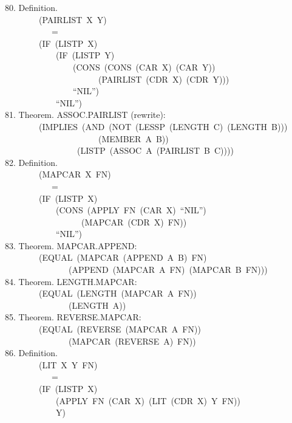 \documentclass[10pt]{book}
\newenvironment{pubasis}{\begin{flushleft}}{\end{flushleft}}
\begin{document}
\begin{pubasis}
80.     Definition.\\
~~~~~~~~(PAIRLIST~X~Y)\\
~~~~~~~~~~~=\\
~~~~~~~~(IF~(LISTP~X)\\
~~~~~~~~~~~~(IF~(LISTP~Y)\\
~~~~~~~~~~~~~~~~(CONS~(CONS~(CAR~X)~(CAR~Y))\\
~~~~~~~~~~~~~~~~~~~~~~(PAIRLIST~(CDR~X)~(CDR~Y)))\\
~~~~~~~~~~~~~~~~``NIL'')\\
~~~~~~~~~~~~``NIL'')\\

81.     Theorem.  ASSOC.PAIRLIST (rewrite):\\
~~~~~~~~(IMPLIES~(AND~(NOT~(LESSP~(LENGTH~C)~(LENGTH~B)))\\
~~~~~~~~~~~~~~~~~~~~~~(MEMBER~A~B))\\
~~~~~~~~~~~~~~~~~(LISTP~(ASSOC~A~(PAIRLIST~B~C))))\\

82.     Definition.\\
~~~~~~~~(MAPCAR~X~FN)\\
~~~~~~~~~~~=\\
~~~~~~~~(IF~(LISTP~X)\\
~~~~~~~~~~~~(CONS~(APPLY~FN~(CAR~X)~``NIL'')\\
~~~~~~~~~~~~~~~~~~(MAPCAR~(CDR~X)~FN))\\
~~~~~~~~~~~~``NIL'')\\

83.     Theorem.  MAPCAR.APPEND:\\
~~~~~~~~(EQUAL~(MAPCAR~(APPEND~A~B)~FN)\\
~~~~~~~~~~~~~~~(APPEND~(MAPCAR~A~FN)~(MAPCAR~B~FN)))\\

84.     Theorem.  LENGTH.MAPCAR:\\
~~~~~~~~(EQUAL~(LENGTH~(MAPCAR~A~FN))\\
~~~~~~~~~~~~~~~(LENGTH~A))\\

85.     Theorem.  REVERSE.MAPCAR:\\
~~~~~~~~(EQUAL~(REVERSE~(MAPCAR~A~FN))\\
~~~~~~~~~~~~~~~(MAPCAR~(REVERSE~A)~FN))\\

86.     Definition.\\
~~~~~~~~(LIT~X~Y~FN)\\
~~~~~~~~~~~=\\
~~~~~~~~(IF~(LISTP~X)\\
~~~~~~~~~~~~(APPLY~FN~(CAR~X)~(LIT~(CDR~X)~Y~FN))\\
~~~~~~~~~~~~Y)\\


\end{pubasis}
\end{document}
